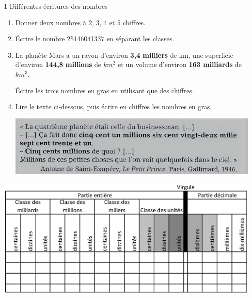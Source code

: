 \documentclass[12pt,a4paper]{article}
\begin{document}
\begin{myact}{1 Différentes écritures des nombres}
	
	\label{act:nbres}
	
	\begin{enumerate}
		\item Donner deux nombres à 2, 3, 4 et 5 chiffres.
		
		\item \'Ecrire  le nombre 25146041337 en séparant les classes.
		\item La planète Mars a un rayon d'environ \textbf{3,4 milliers} de km, une superficie d'environ \textbf{144,8 millions} de $km^2$ et un volume d'environ \textbf{163 milliards} de $km^3$.
		
		\'Ecrire les trois nombres en gras en utilisant que des chiffres.
		
		\item Lire le texte ci-dessous, puis écrire en chiffres les nombres en gras.
		
		\begin{center}
			\includegraphics[scale=1.1]{img/act1}
		\end{center}
	\end{enumerate}
\end{myact}


\begin{center}
	\includegraphics[scale=0.3]{img/tab_rangs}
\end{center}
\end{document}
